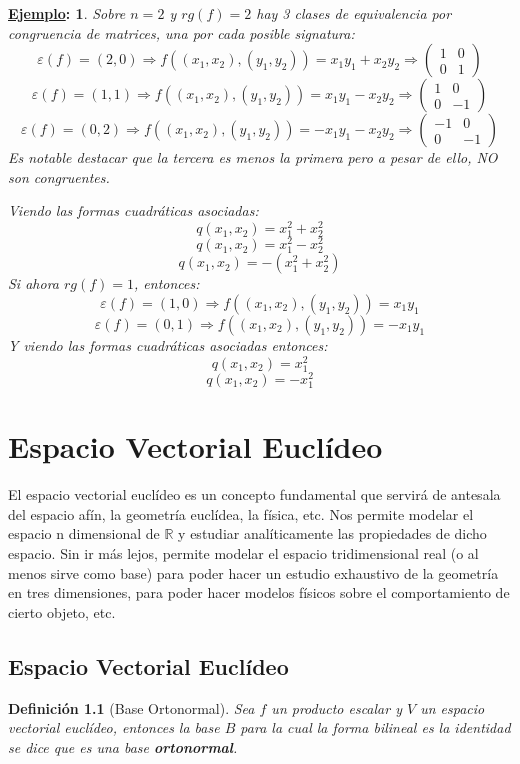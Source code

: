 \documentclass[10pt,a4paper,openright]{book}
\theoremstyle{break}
\newtheorem*{defi}{Definición}
\newtheorem*{ej}{\underline{Ejemplo}:}
\begin{document}
\begin{ej}
Sobre $n= 2$ y $rg(f)=2$ hay 3 clases de equivalencia por congruencia de matrices, una por cada posible signatura:
$$\varepsilon(f)=(2,0)\Rightarrow f((x_1,x_2),(y_1,y_2)) = x_1y_1+x_2y_2 \Rightarrow \begin{pmatrix} 1 & 0 \\ 0 & 1\end{pmatrix}$$
$$\varepsilon(f)=(1,1)\Rightarrow f((x_1,x_2),(y_1,y_2)) = x_1y_1-x_2y_2 \Rightarrow \begin{pmatrix} 1 & 0 \\ 0 & -1\end{pmatrix}$$
$$\varepsilon(f)=(0,2)\Rightarrow f((x_1,x_2),(y_1,y_2)) = -x_1y_1-x_2y_2 \Rightarrow \begin{pmatrix} -1 & 0 \\ 0 & -1\end{pmatrix}$$
Es notable destacar que la tercera es menos la primera pero a pesar de ello, NO son congruentes.

Viendo las formas cuadráticas asociadas:
$$q(x_1,x_2) = x_1^2+x_2^2$$
$$q(x_1,x_2) = x_1^2-x_2^2$$
$$q(x_1,x_2) = -(x_1^2+x_2^2)$$
Si ahora $rg(f)=1$, entonces:
$$\varepsilon(f)=(1,0)\Rightarrow f((x_1,x_2),(y_1,y_2)) = x_1y_1$$
$$\varepsilon(f)=(0,1)\Rightarrow f((x_1,x_2),(y_1,y_2)) = -x_1y_1$$
Y viendo las formas cuadráticas asociadas entonces:
$$q(x_1,x_2) = x_1^2$$
$$q(x_1,x_2) = -x_1^2$$
\end{ej}



\chapter{Espacio Vectorial Euclídeo}
El espacio vectorial euclídeo es un concepto fundamental que servirá de antesala del espacio afín, la geometría euclídea, la física, etc. Nos permite modelar el espacio n dimensional de $\mathbb{R}$ y estudiar analíticamente las propiedades de dicho espacio. Sin ir más lejos, permite modelar el espacio tridimensional real (o al menos sirve como base) para poder hacer un estudio exhaustivo de la geometría en tres dimensiones, para poder hacer modelos físicos sobre el comportamiento de cierto objeto, etc.

\section{Espacio Vectorial Euclídeo}
\begin{defi}[Base Ortonormal]
Sea $f$ un producto escalar y $V$ un espacio vectorial euclídeo, entonces la base $B$ para la cual la forma bilineal es la identidad se dice que es una base \textbf{ortonormal}.
\end{defi}
\end{document}
